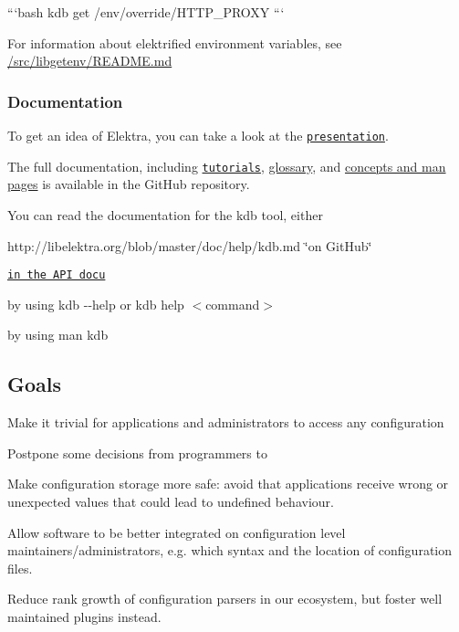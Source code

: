```bash kdb get /env/override/\+H\+T\+T\+P\+\_\+\+P\+R\+O\+X\+Y ```

For information about elektrified environment variables, see \hyperlink{md_src_libs_getenv_README_src_libs_getenv_README_md}{/src/libgetenv/\+R\+E\+A\+D\+M\+E.md}

\subsubsection*{Documentation}

To get an idea of Elektra, you can take a look at the \href{http://www.libelektra.org/ftp/elektra/presentations/2016/FOSDEM/fosdem.odp}{\tt presentation}.

The full documentation, including \href{http://libelektra.org/blob/master/doc/tutorials/}{\tt tutorials}, \hyperlink{md_doc_help_elektra-glossary_doc_help_elektra-glossary_md}{glossary}, and \hyperlink{md_doc_help_elektra-introduction_doc_help_elektra-introduction_md}{concepts and man pages} is available in the Git\+Hub repository.

You can read the documentation for the kdb tool, either


\begin{DoxyItemize}
\item http\+://libelektra.org/blob/master/doc/help/kdb.\+md \char`\"{}on Git\+Hub\char`\"{}
\item \href{http://doc.libelektra.org/api/latest/html/md_doc_help_kdb.html}{\tt in the A\+P\+I docu}
\item by using {\ttfamily kdb -\/-\/help} or {\ttfamily kdb help $<$command$>$}
\item by using {\ttfamily man kdb}
\end{DoxyItemize}

\subsection*{Goals}


\begin{DoxyItemize}
\item Make it trivial for applications and administrators to access any configuration
\item Postpone some decisions from programmers to
\item Make configuration storage more safe\+: avoid that applications receive wrong or unexpected values that could lead to undefined behaviour.
\item Allow software to be better integrated on configuration level maintainers/administrators, e.\+g. which syntax and the location of configuration files.
\item Reduce rank growth of configuration parsers in our ecosystem, but foster well maintained plugins instead.
\end{DoxyItemize}

